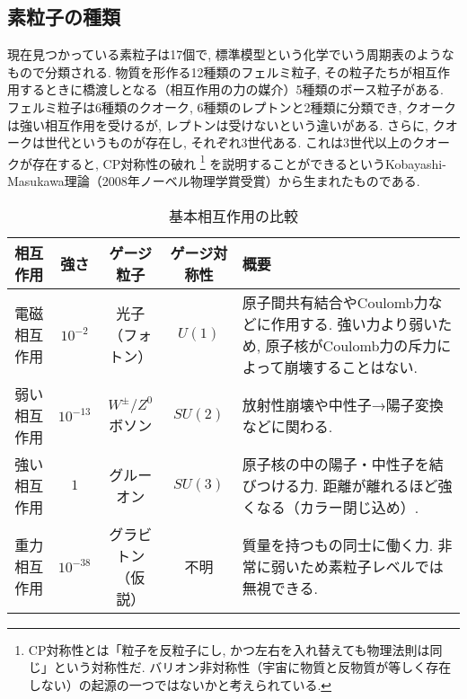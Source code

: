 \documentclass{ltjsarticle}
\begin{document}
\subsection{素粒子の種類}
現在見つかっている素粒子は17個で, 標準模型という化学でいう周期表のようなもので分類される. 
物質を形作る12種類のフェルミ粒子, その粒子たちが相互作用するときに橋渡しとなる（相互作用の力の媒介）5種類のボース粒子がある. 
フェルミ粒子は6種類のクオーク, 6種類のレプトンと2種類に分類でき, クオークは強い相互作用を受けるが, レプトンは受けないという違いがある. 
さらに, クオークは世代というものが存在し, それぞれ3世代ある. 
これは3世代以上のクオークが存在すると, CP対称性の破れ
\footnote{
    CP対称性とは「粒子を反粒子にし, かつ左右を入れ替えても物理法則は同じ」という対称性だ. 
バリオン非対称性（宇宙に物質と反物質が等しく存在しない）の起源の一つではないかと考えられている. 
}
を説明することができるというKobayashi-Masukawa理論（2008年ノーベル物理学賞受賞）から生まれたものである. 

\begin{table}[h]
\centering
\begin{tabular}{c|c|c|c|p{6cm}}
相互作用 & 強さ & ゲージ粒子 & ゲージ対称性 & 概要 \\
\hline
電磁相互作用 & $10^{-2}$ & 光子（フォトン） & $U(1)$ & 原子間共有結合やCoulomb力などに作用する. 強い力より弱いため, 原子核がCoulomb力の斥力によって崩壊することはない.  \\
弱い相互作用 & $10^{-13}$ & $W^{\pm}$/$Z^0$ボソン & $SU(2)$ & 放射性崩壊や中性子→陽子変換などに関わる.  \\
強い相互作用 & $1$ & グルーオン & $SU(3)$ & 原子核の中の陽子・中性子を結びつける力. 距離が離れるほど強くなる（カラー閉じ込め）.  \\
重力相互作用 & $10^{-38}$ & グラビトン（仮説） & 不明 & 質量を持つもの同士に働く力. 非常に弱いため素粒子レベルでは無視できる.  \\
\end{tabular}
\caption{基本相互作用の比較}
\label{tab:forces}
\end{table}





\end{document}
